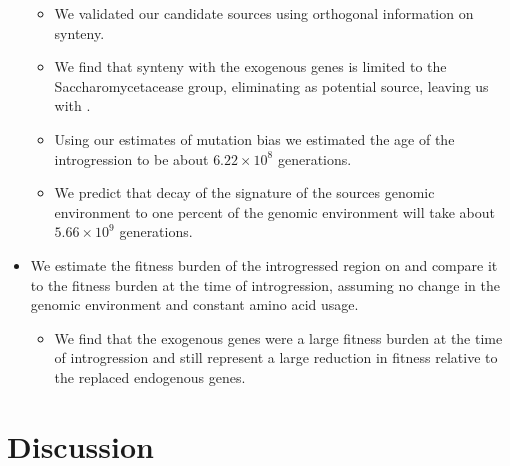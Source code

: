 \documentclass[12pt]{article}
\begin{document}
\begin{itemize}
\begin{itemize}
		\item We validated our candidate sources using orthogonal information on synteny.
		\item We find that synteny with the exogenous genes is limited to the Saccharomycetacease group, eliminating \dubl as potential source, leaving us with \gossypii.
		\item Using our estimates of mutation bias we estimated the age of the introgression to be about $6.22\times10^8$ generations.
		\item We predict that decay of the signature of the sources genomic environment to one percent of the \kluyveri genomic environment will take about $5.66\times10^9$ generations.
	\end{itemize}
	\item We estimate the fitness burden of the introgressed region on \kluyveri and compare it to the fitness burden at the time of introgression, assuming no change in the \gossypii genomic environment and constant amino acid usage.  	
	\begin{itemize}
		\item We find that the exogenous genes were a large fitness burden at the time of introgression and still represent a large reduction in fitness relative to the replaced endogenous genes.
	\end{itemize} 
\end{itemize}

\section*{Discussion}
\end{document}
